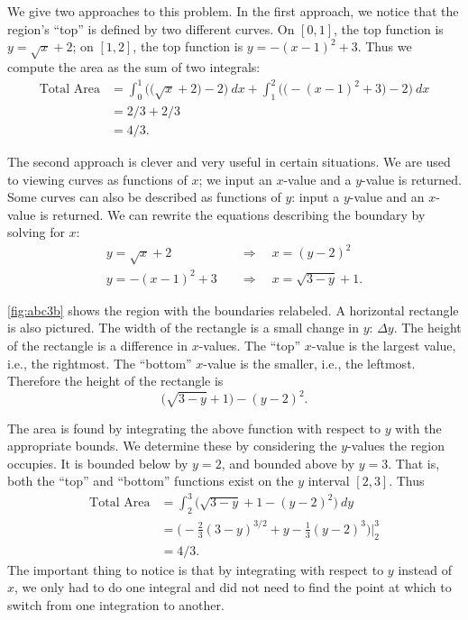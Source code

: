 {We give two approaches to this problem. In the first approach, we notice that the region's ``top'' is defined by two different curves. On $[0,1]$, the top function is $y=\sqrt{x}+2$; on $[1,2]$, the top function is $y=-(x-1)^2+3$. 
Thus we compute the area as the sum of two integrals:
\begin{align*}
	\text{Total Area}
	&= \int_0^1 \Big(\big(\sqrt{x}+2\big)-2\Big)\ dx + \int_1^2 \Big(\big(-(x-1)^2+3\big)-2\Big)\ dx \\
	&= 2/3 + 2/3\\
	&=4/3.
\end{align*}

The second approach is clever and very useful in certain situations. We are used to viewing curves as functions of $x$; we input an $x$-value and a $y$-value is returned. Some curves can also be described as functions of $y$: input a $y$-value and an $x$-value is returned. We can rewrite the equations describing the boundary by solving for $x$:
\begin{align*}
y=\sqrt{x}+2 & \quad\Rightarrow\quad x=(y-2)^2 \\
y=-(x-1)^2+3 & \quad\Rightarrow\quad x=\sqrt{3-y}+1.
\end{align*}

\autoref{fig:abc3b} shows the region with the boundaries relabeled. A
horizontal rectangle is also pictured. The width of the rectangle is a small change in $y$: $\Delta y$. The height of the rectangle is a difference in $x$-values. The ``top'' $x$-value is the largest value, i.e., the rightmost. The ``bottom'' $x$-value is the smaller, i.e., the leftmost. Therefore the height of the rectangle is
\[\big(\sqrt{3-y}+1\big) - (y-2)^2.\]

The area is found by integrating the above function with respect to $y$ with the appropriate bounds. We determine these by considering the $y$-values the region occupies. It is bounded below by $y=2$, and bounded above by $y=3$. That is, both the ``top'' and ``bottom'' functions exist on the $y$ interval $[2,3]$. Thus
\begin{align*}
	\text{Total Area}
	&= \int_2^3 \big(\sqrt{3-y}+1 - (y-2)^2\big)\ dy \\
	&= \Big(-\frac23(3-y)^{3/2}+y-\frac13(y-2)^3\Big)\Big|_2^3 \\
	&= 4/3.
\end{align*}
The important thing to notice is that by integrating with respect to $y$ instead of $x$, we only had to do one integral and did not need to find the point at which to switch from one integration to another.}

